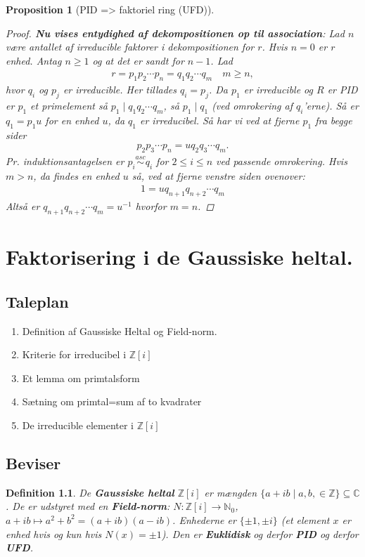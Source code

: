\documentclass[10pt,twoside,openany,final]{memoir}
\theoremstyle{break}
\newtheorem{proposition}[section]{Proposition}
\newtheorem{definition}[section]{Definition}
\theoremstyle{Break}
\newcommand{\C}{\mathbb{C}}
\newcommand{\N}{\mathbb{N}}
\newcommand{\Z}{\mathbb{Z}}
\begin{document}
\begin{proposition}[PID => faktoriel ring (UFD)]
\begin{proof}
\textbf{Nu vises entydighed af dekompositionen op til association}: Lad $n$ være antallet af irreducible faktorer i dekompositionen for $r$. Hvis $n=0$ er $r$ enhed. Antag $n \geq 1$ og at det er sandt for $n-1$. Lad
\begin{align*}
r=p_1p_2\cdots p_n=q_1q_2\cdots q_m \quad m \geq n,
\end{align*}
hvor $q_i$ og $p_j$ er irreducible. Her tillades $q_i=p_j$. Da $p_1$ er irreducible og $R$ er PID er $p_1$ et primelement så $p_1 \mid q_1q_2\cdots q_m$, så $p_1 \mid q_1$ (ved omrokering af $q_i$'erne). Så er $q_1=p_1u$ for en enhed $u$, da $q_1$ er irreducibel. Så har vi ved at fjerne $p_1$ fra begge sider
\begin{align*}
p_2p_3\cdots p_n = uq_2q_3\cdots q_m.
\end{align*}
Pr. induktionsantagelsen er $p_i\stackrel{asc}{\sim}q_i$ for $2 \leq i \leq n$ ved passende omrokering. Hvis $m >n$, da findes en enhed $u$ så, ved at fjerne venstre siden ovenover:
\begin{align*}
1=uq_{n+1}q_{n+2}\cdots q_{m}
\end{align*}
Altså er $q_{n+1}q_{n+2}\cdots q_{m}=u^{-1}$ hvorfor $m=n$.
\end{proof}
\end{proposition}


\chapter{Faktorisering i de Gaussiske heltal.}
\section*{Taleplan}
\begin{enumerate}
\item Definition af Gaussiske Heltal og Field-norm.
\item Kriterie for irreducibel i $\Z[i]$
\item Et lemma om primtalsform
\item Sætning om primtal=sum af to kvadrater 
\item De irreducible elementer i $\Z[i]$
\end{enumerate}
\section*{Beviser}
\begin{definition}
De \textbf{Gaussiske heltal} $\Z[i]$ er mængden $\{ a+i b \mid a,b, \in \Z\}\subseteq \C$. De er udstyret med en \textbf{Field-norm}: $N \colon \Z[i] \to \N_0$, $a+ib \mapsto a^2+b^2=(a+ib)(a-ib)$. Enhederne  er $\{ \pm 1 , \pm i\}$ (et element $x$ er enhed hvis og kun hvis $N(x)=\pm 1$). Den er \textbf{Euklidisk} og derfor \textbf{PID} og derfor \textbf{UFD}.
\end{definition}
\end{document}
